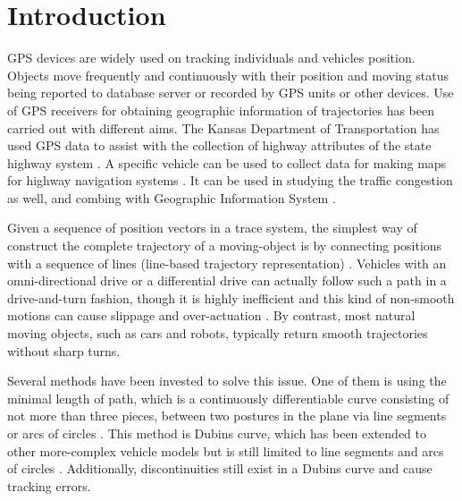 
\section{Introduction}

GPS devices are widely used on tracking individuals and vehicles position. Objects move frequently and continuously with their position and moving status being reported to database server or recorded by GPS units or other devices. Use of GPS receivers for obtaining geographic information of trajectories has been carried out with different aims. The Kansas Department of Transportation has used GPS data to assist with the collection of highway attributes of the state highway system \cite{ben2004geometric}.  A specific vehicle can be used to collect data for making maps for highway navigation systems \cite{Atkinson2004}. It can be used in studying the traffic congestion as well, and combing with Geographic Information System \cite{taylor2000integration}. 

Given a sequence of position vectors in a trace system, the simplest way of construct the complete trajectory of a moving-object is by connecting positions with a sequence of lines (line-based trajectory representation) \cite{agarwal2003indexing}. Vehicles with an omni-directional drive or a differential drive can actually follow such a path in a drive-and-turn fashion, though it is highly inefficient \cite{gloderer2010spline} and this kind of non-smooth motions can cause slippage and over-actuation \cite{magid2006spline}. By contrast, most natural moving objects, such as cars and robots, typically return smooth trajectories without sharp turns. 

Several methods have been invested to solve this issue. One of them is using the minimal length of path, which is a continuously differentiable curve consisting of not more than three pieces,  between two postures in the plane via line segments or arcs of circles \cite{dubins1957curves}. This method is Dubins curve, which has been extended to other more-complex vehicle models but is still limited to line segments and arcs of circles \cite{yang2010analytical}. Additionally, discontinuities still exist in a Dubins curve and cause tracking errors. 

